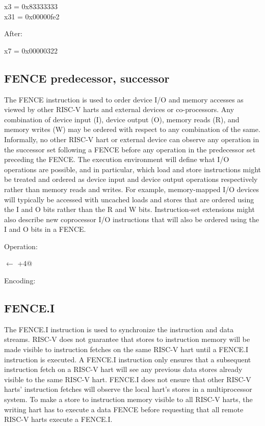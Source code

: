 x3  = 0x83333333\\
x31 = 0x00000fe2

After:

x7 = 0x00000322

\subsection{FENCE predecessor, successor}

%
The FENCE instruction is used to order device I/O and memory accesses as 
viewed by other RISC-V harts and external devices or co-processors. Any 
combination of device input (I), device output (O), memory reads (R), 
and memory writes (W) may be ordered with respect to any combination
of the same. Informally, no other RISC-V hart or external device can 
observe any operation in the successor set following a FENCE before any 
operation in the predecessor set preceding the FENCE. The execution 
environment will define what I/O operations are possible, and in particular, 
which load and store instructions might be treated and ordered as device 
input and device output operations respectively rather than memory reads 
and writes. For example, memory-mapped I/O devices will typically be 
accessed with uncached loads and stores that are ordered using the I and O
 bits rather than the R and W bits. Instruction-set extensions might 
also describe new coprocessor I/O instructions that will also be ordered 
using the I and O bits in a FENCE.~\cite[p.~21]{rvismv1v22:2017}

Operation:

\verb@pc@ $\leftarrow$ \verb@pc+4@

Encoding:


\subsection{FENCE.I}

The FENCE.I instruction is used to synchronize the instruction and 
data streams. RISC-V does not guarantee that stores to instruction 
memory will be made visible to instruction fetches on the same
RISC-V hart until a FENCE.I instruction is executed. A FENCE.I 
instruction only ensures that a subsequent instruction fetch on 
a RISC-V hart will see any previous data stores already visible to 
the same RISC-V hart. FENCE.I does not ensure that other RISC-V harts' 
instruction fetches will observe the local hart's stores in a 
multiprocessor system. To make a store to instruction memory
visible to all RISC-V harts, the writing hart has to execute a 
data FENCE before requesting that all remote RISC-V harts execute 
a FENCE.I.~\cite[p.~21]{rvismv1v22:2017}

